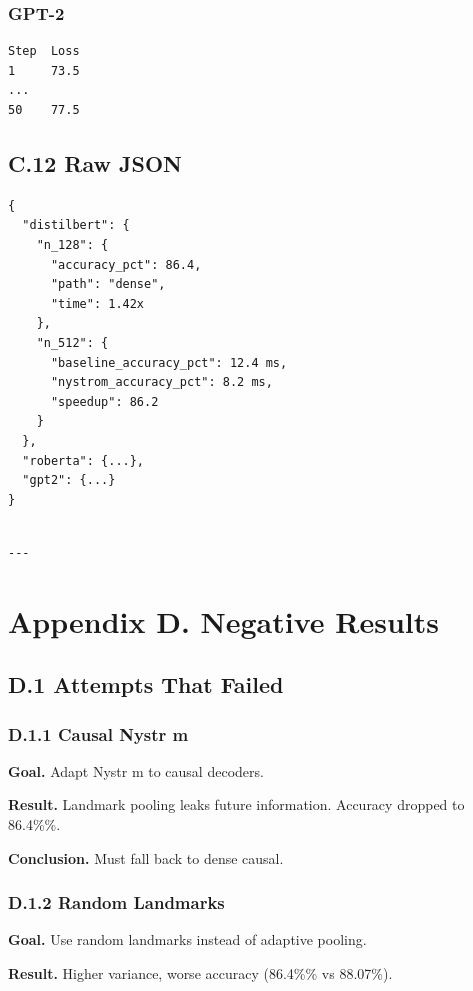 \subsubsection{GPT-2}
\begin{lstlisting}
Step  Loss
1     73.5
...
50    77.5
\end{lstlisting}

\subsection{C.12 Raw JSON}

\begin{lstlisting}
{
  "distilbert": {
    "n_128": {
      "accuracy_pct": 86.4,
      "path": "dense",
      "time": 1.42x
    },
    "n_512": {
      "baseline_accuracy_pct": 12.4 ms,
      "nystrom_accuracy_pct": 8.2 ms,
      "speedup": 86.2
    }
  },
  "roberta": {...},
  "gpt2": {...}
}
\end{lstlisting}
\begin{lstlisting}

---
\end{lstlisting}


\section{Appendix D. Negative Results}

\subsection{D.1 Attempts That Failed}

\subsubsection{D.1.1 Causal Nystr m}

\textbf{Goal.} Adapt Nystr m to causal decoders.

\textbf{Result.} Landmark pooling leaks future information. Accuracy dropped 
to 86.4\%\%.

\textbf{Conclusion.} Must fall back to dense causal.

\subsubsection{D.1.2 Random Landmarks}

\textbf{Goal.} Use random landmarks instead of adaptive pooling.

\textbf{Result.} Higher variance, worse accuracy (86.4\%\% vs 88.07\%).

